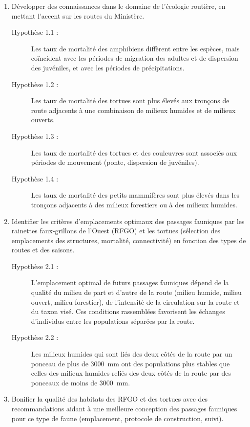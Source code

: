 \begin{enumerate}
\item Développer des connaissances dans le domaine de l'écologie routière, en mettant l'accent sur les routes du Ministère.

\begin{description}
\item[Hypothèse 1.1 :] Les taux de mortalité des amphibiens diffèrent
                entre les espèces, mais coïncident avec les périodes de migration
                des adultes et de dispersion des juvéniles, et avec les périodes de
                précipitations.
\item[Hypothèse 1.2 :] Les taux de mortalité des tortues sont plus élevés
                aux tronçons de route adjacents à une combinaison de milieux humides
                et de milieux ouverts.
\item[Hypothèse 1.3 :] Les taux de mortalité des tortues et des couleuvres
                sont associés aux périodes de mouvement (ponte, dispersion de
                juvéniles).
\item[Hypothèse 1.4 :] Les taux de mortalité des petits mammifères sont
                plus élevés dans les tronçons adjacents à des milieux forestiers ou
                à des milieux humides.
                
\end{description}

\item Identifier les critères d'emplacements optimaux des passages fauniques par
        les rainettes faux-grillons de l'Ouest (RFGO) et les tortues (sélection des
        emplacements des structures, mortalité, connectivité) en fonction des types
        de routes et des saisons.

\begin{description}

\item[Hypothèse 2.1 :] L'emplacement optimal de futurs passages fauniques
                dépend de la qualité du milieu de part et d'autre de la route
                (milieu humide, milieu ouvert, milieu forestier), de l'intensité de
                la circulation sur la route et du taxon visé. Ces conditions
                rassemblées favorisent les échanges d'individus entre les
                populations séparées par la route.
          \item[Hypothèse 2.2 :] Les milieux humides qui sont liés des deux côtés de
                la route par un ponceau de plus de 3000~mm ont des populations plus
                stables que celles des milieux humides reliés des deux côtés de la
                route par des ponceaux de moins de 3000~mm.
        \end{description}

  \item Bonifier la qualité des habitats des RFGO et des tortues avec des
        recommandations aidant à une meilleure conception des passages fauniques
        pour ce type de faune (emplacement, protocole de construction, suivi).
\end{enumerate}

